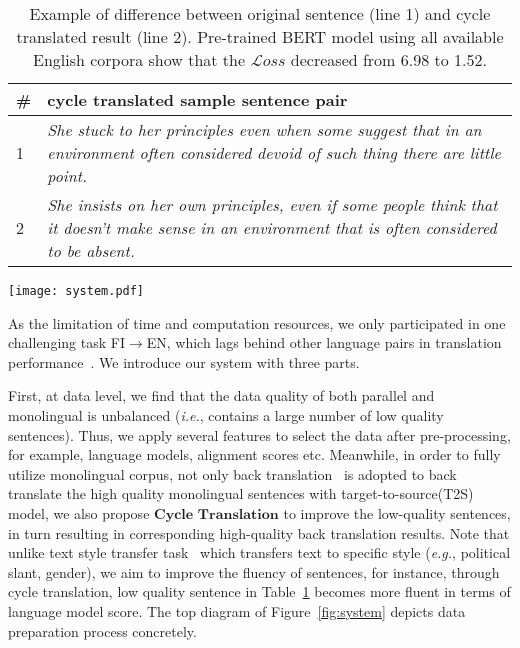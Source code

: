 \documentclass[11pt,a4paper]{article}
\begin{document}
    \begin{table}[t!]
    \begin{center}
    \begin{tabular}{|l|p{6.4cm}|}
    \hline 
    \# & \textbf{cycle translated sample sentence pair}\\
    \hline
    1 & \textit{She stuck to her principles even when some suggest that in an environment often considered devoid of such thing there are little point.}\\ 
    \hline
    2 & \textit{She insists on her own principles, even if some people think that it doesn't make sense in an environment that is often considered to be absent.}\\ 
    \hline
    \end{tabular}
    \end{center}
    \caption{\label{tab:sentences}Example of difference between original sentence (line 1) and cycle translated result (line 2). Pre-trained BERT model using all available English corpora show that the $\mathcal{L}oss$ decreased from 6.98 to 1.52.}
    \end{table}
  
\begin{figure*}[htb]
    \centering
    \texttt{[image: system.pdf]}
    \caption{The schematic structure of the three main stages of the USYD-NMT. They are data preparation stage, model training stage and inference phrase. For brevity, here Mono, Para, and Valid represent the monolingual, parallel and validation data respectively.}
    \label{fig:system}
\end{figure*}
  
  As the limitation of time and computation resources, we only participated in one challenging task FI$\rightarrow$EN, which lags behind other language pairs in translation performance~\cite{bojar-etal-2018-findings}. We introduce our system with three parts. 
  
  First, at data level, we find that the data quality of both parallel and monolingual is unbalanced (\textit{i.e.}, contains a large number of low quality sentences). Thus, we apply several features to select the data after pre-processing, for example, language models, alignment scores etc. Meanwhile, in order to fully utilize monolingual corpus, not only back translation~\cite{sennrich2015improving} is adopted to back translate the high quality monolingual sentences with target-to-source(T2S) model, we also propose $\textbf{Cycle Translation}$ to improve the low-quality sentences, in turn resulting in corresponding high-quality back translation results. Note that unlike text style transfer task~\cite{shen2017style,fu2018style,prabhumoye2018style} which transfers text to specific style (\textit{e.g.}, political slant, gender), we aim to improve the fluency of sentences, for instance, through cycle translation, low quality sentence in Table~\ref{tab:sentences} becomes more fluent in terms of language model score. The top diagram of Figure~\ref{fig:system} depicts data preparation process concretely.
  
\end{document}
